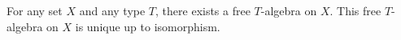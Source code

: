 For any set $X$ and any type $T$, there exists a free $T$-algebra on $X$. This free $T$-algebra on $X$ is unique up to isomorphism.
